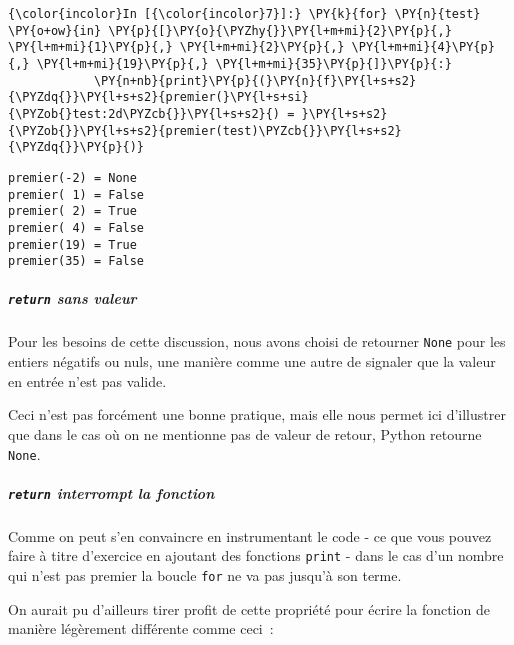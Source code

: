     \begin{Verbatim}[commandchars=\\\{\}]
{\color{incolor}In [{\color{incolor}7}]:} \PY{k}{for} \PY{n}{test} \PY{o+ow}{in} \PY{p}{[}\PY{o}{\PYZhy{}}\PY{l+m+mi}{2}\PY{p}{,} \PY{l+m+mi}{1}\PY{p}{,} \PY{l+m+mi}{2}\PY{p}{,} \PY{l+m+mi}{4}\PY{p}{,} \PY{l+m+mi}{19}\PY{p}{,} \PY{l+m+mi}{35}\PY{p}{]}\PY{p}{:}
            \PY{n+nb}{print}\PY{p}{(}\PY{n}{f}\PY{l+s+s2}{\PYZdq{}}\PY{l+s+s2}{premier(}\PY{l+s+si}{\PYZob{}test:2d\PYZcb{}}\PY{l+s+s2}{) = }\PY{l+s+s2}{\PYZob{}}\PY{l+s+s2}{premier(test)\PYZcb{}}\PY{l+s+s2}{\PYZdq{}}\PY{p}{)}
\end{Verbatim}


    \begin{Verbatim}[commandchars=\\\{\}]
premier(-2) = None
premier( 1) = False
premier( 2) = True
premier( 4) = False
premier(19) = True
premier(35) = False

    \end{Verbatim}

    \hypertarget{return-sans-valeur}{%
\subparagraph{\texorpdfstring{\texttt{return} sans
valeur}{return sans valeur}}\label{return-sans-valeur}}

    Pour les besoins de cette discussion, nous avons choisi de retourner
\texttt{None} pour les entiers négatifs ou nuls, une manière comme une
autre de signaler que la valeur en entrée n'est pas valide.

Ceci n'est pas forcément une bonne pratique, mais elle nous permet ici
d'illustrer que dans le cas où on ne mentionne pas de valeur de retour,
Python retourne \texttt{None}.

    \hypertarget{return-interrompt-la-fonction}{%
\subparagraph{\texorpdfstring{\texttt{return} interrompt la
fonction}{return interrompt la fonction}}\label{return-interrompt-la-fonction}}

    Comme on peut s'en convaincre en instrumentant le code - ce que vous
pouvez faire à titre d'exercice en ajoutant des fonctions \texttt{print}
- dans le cas d'un nombre qui n'est pas premier la boucle \texttt{for}
ne va pas jusqu'à son terme.

    On aurait pu d'ailleurs tirer profit de cette propriété pour écrire la
fonction de manière légèrement différente comme ceci~:

